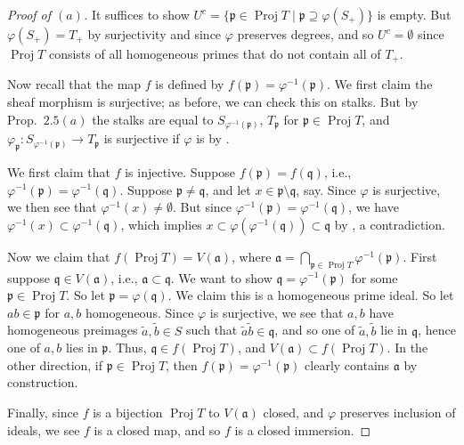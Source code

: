 \documentclass[12pt,letterpaper]{article}
\theoremstyle{definition}
\theoremstyle{remark}
\numberwithin{equation}{section}
\numberwithin{figure}{problem}
\DeclareMathOperator{\Proj}{Proj}
\begin{document}
\begin{proof}[Proof of $(a)$]
  It suffices to show $U^c = \{\mathfrak{p} \in \Proj T \mid \mathfrak{p} \supseteq \varphi(S_+)\}$ is empty. But $\varphi(S_+) = T_+$ by surjectivity and since $\varphi$ preserves degrees, and so $U^c = \emptyset$ since $\Proj T$ consists of all homogeneous primes that do not contain all of $T_+$.
  \par Now recall that the map $f$ is defined by $f(\mathfrak{p}) = \varphi^{-1}(\mathfrak{p})$. We first claim the sheaf morphism is surjective; as before, we can check this on stalks. But by Prop.~$2.5(a)$ the stalks are equal to $S_{\varphi^{-1}(\mathfrak{p})}$, $T_{\mathfrak{p}}$ for $\mathfrak{p} \in \Proj T$, and $\varphi_{\mathfrak{p}}\colon S_{\varphi^{-1}(\mathfrak{p})} \to T_{\mathfrak{p}}$ is surjective if $\varphi$ is by \cite[Prop.~3.9]{AM69}.
  \par We first claim that $f$ is injective. Suppose $f(\mathfrak{p}) = f(\mathfrak{q})$, i.e., $\varphi^{-1}(\mathfrak{p}) = \varphi^{-1}(\mathfrak{q})$. Suppose $\mathfrak{p} \ne \mathfrak{q}$, and let $x \in \mathfrak{p} \setminus \mathfrak{q}$, say. Since $\varphi$ is surjective, we then see that $\varphi^{-1}(x) \ne \emptyset$. But since $\varphi^{-1}(\mathfrak{p}) = \varphi^{-1}(\mathfrak{q})$, we have $\varphi^{-1}(x) \subset \varphi^{-1}(\mathfrak{q})$, which implies $x \subset \varphi(\varphi^{-1}(\mathfrak{q})) \subset \mathfrak{q}$ by \cite[Prop.~1.17i]{AM69}, a contradiction. 
  \par Now we claim that $f(\Proj T) = V(\mathfrak{a})$, where $\mathfrak{a} = \bigcap_{\mathfrak{p} \in \Proj T} \varphi^{-1}(\mathfrak{p})$. First suppose $\mathfrak{q} \in V(\mathfrak{a})$, i.e., $\mathfrak{a} \subset \mathfrak{q}$. We want to show $\mathfrak{q} = \varphi^{-1}(\mathfrak{p})$ for some $\mathfrak{p} \in \Proj T$. So let $\mathfrak{p} = \varphi(\mathfrak{q})$. We claim this is a homogeneous prime ideal. So let $ab \in \mathfrak{p}$ for $a,b$ homogeneous. Since $\varphi$ is surjective, we see that $a,b$ have homogeneous preimages $\tilde{a},\tilde{b} \in S$ such that $\tilde{a}\tilde{b} \in \mathfrak{q}$, and so one of $\tilde{a},\tilde{b}$ lie in $\mathfrak{q}$, hence one of $a,b$ lies in $\mathfrak{p}$. Thus, $\mathfrak{q} \in f(\Proj T)$, and $V(\mathfrak{a}) \subset f(\Proj T)$. In the other direction, if $\mathfrak{p} \in \Proj T$, then $f(\mathfrak{p}) = \varphi^{-1}(\mathfrak{p})$ clearly contains $\mathfrak{a}$ by construction.
  \par Finally, since $f$ is a bijection $\Proj T$ to $V(\mathfrak{a})$ closed, and $\varphi$ preserves inclusion of ideals, we see $f$ is a closed map, and so $f$ is a closed immersion.
\end{proof}
\end{document}
